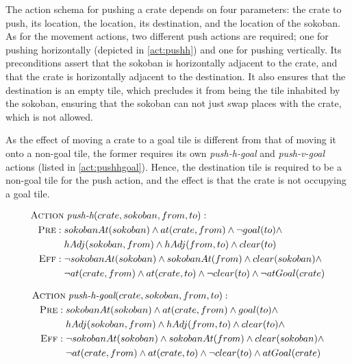 \documentclass[../Master.tex]{subfiles}
\begin{document}
The action schema for pushing a crate depends on four parameters: the crate to push, its location, the location, its destination, and the location of the sokoban. As for the movement actions, two different push actions are required; one for pushing horizontally (depicted in \eqref{act:pushh}) and one for pushing vertically. Its preconditions assert that the sokoban is horizontally adjacent to the crate, and that the crate is horizontally adjacent to the destination. It also ensures that the destination is an empty tile, which precludes it from being the tile inhabited by the sokoban, ensuring that the sokoban can not just swap places with the crate, which is not allowed.

As the effect of moving a crate to a goal tile is different from that of moving it onto a non-goal tile, the former requires its own \textit{push-h-goal}  and \textit{push-v-goal} actions (listed in \eqref{act:pushhgoal}). Hence, the destination tile is required to be a non-goal tile for the push action, and the effect is that the crate is not occupying a goal tile.

\begin{align}
\begin{split} \label{act:pushh}
\textsc{Action} &\; \textit{push-h}(crate, sokoban, from, to): \\
\textsc{Pre}: \; & sokobanAt(sokoban) \land
at(crate, from) \land
\neg goal(to) \land \\
& hAdj(sokoban, from) \land
hAdj(from, to) \land
clear(to)
\\
\textsc{Eff}: \; & \neg sokobanAt(sokoban) \land
sokobanAt(from) \land
clear(sokoban) \land \\
& \neg at(crate, from) \land
at(crate, to) \land
\neg clear(to) \land
\neg atGoal(crate)
\end{split}
\end{align}

\begin{align}
\begin{split} \label{act:pushhgoal}
\textsc{Action} &\; \textit{push-h-goal}(crate, sokoban, from, to): \\
\textsc{Pre}: \; & sokobanAt(sokoban) \land
at(crate, from) \land
goal(to) \land \\
& hAdj(sokoban, from) \land
hAdj(from, to) \land
clear(to) \land
\\
\textsc{Eff}: \; & \neg sokobanAt(sokoban) \land
sokobanAt(from) \land
clear(sokoban) \land \\
& \neg at(crate, from) \land
at(crate, to) \land
\neg clear(to) \land
atGoal(crate)
\end{split}
\end{align}
\end{document}
